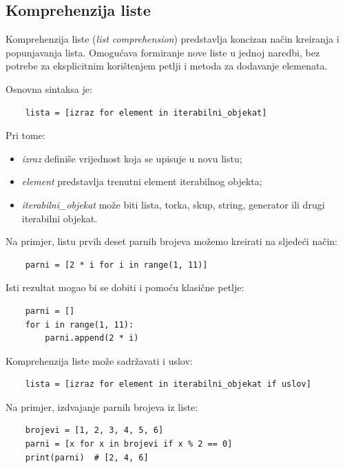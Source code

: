 \subsection{Komprehenzija liste}

Komprehenzija liste (\textit{list comprehension}) predstavlja koncizan način kreiranja i popunjavanja lista. Omogućava formiranje nove liste u jednoj naredbi, bez potrebe za eksplicitnim korištenjem petlji i metoda za dodavanje elemenata.

Osnovna sintaksa je:

\begin{verbatim}
	lista = [izraz for element in iterabilni_objekat]
\end{verbatim}

Pri tome:

\begin{itemize}
	\item \textit{izraz} definiše vrijednost koja se upisuje u novu listu;
	\item \textit{element} predstavlja trenutni element iterabilnog objekta;
	\item \textit{iterabilni\_objekat} može biti lista, torka, skup, string, generator ili drugi iterabilni objekat.
\end{itemize}

Na primjer, listu prvih deset parnih brojeva možemo kreirati na sljedeći način:

\begin{verbatim}
	parni = [2 * i for i in range(1, 11)]
\end{verbatim}

Isti rezultat mogao bi se dobiti i pomoću klasične petlje:

\begin{verbatim}
	parni = []
	for i in range(1, 11):
	    parni.append(2 * i)
\end{verbatim}

Komprehenzija liste može sadržavati i uslov:

\begin{verbatim}
	lista = [izraz for element in iterabilni_objekat if uslov]
\end{verbatim}

Na primjer, izdvajanje parnih brojeva iz liste:

\begin{verbatim}
	brojevi = [1, 2, 3, 4, 5, 6]
	parni = [x for x in brojevi if x % 2 == 0]
	print(parni)  # [2, 4, 6]
\end{verbatim}

